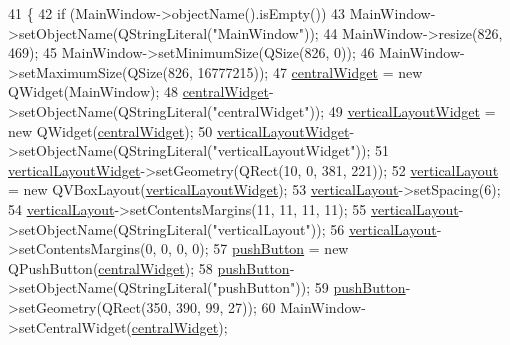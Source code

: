 \begin{DoxyCode}
41     \{
42         \textcolor{keywordflow}{if} (MainWindow->objectName().isEmpty())
43             MainWindow->setObjectName(QStringLiteral(\textcolor{stringliteral}{"MainWindow"}));
44         MainWindow->resize(826, 469);
45         MainWindow->setMinimumSize(QSize(826, 0));
46         MainWindow->setMaximumSize(QSize(826, 16777215));
47         \hyperlink{class_ui___main_window_a30075506c2116c3ed4ff25e07ae75f81}{centralWidget} = \textcolor{keyword}{new} QWidget(MainWindow);
48         \hyperlink{class_ui___main_window_a30075506c2116c3ed4ff25e07ae75f81}{centralWidget}->setObjectName(QStringLiteral(\textcolor{stringliteral}{"centralWidget"}));
49         \hyperlink{class_ui___main_window_a805d415fff07a22a85219e1f22f2da28}{verticalLayoutWidget} = \textcolor{keyword}{new} QWidget(\hyperlink{class_ui___main_window_a30075506c2116c3ed4ff25e07ae75f81}{centralWidget});
50         \hyperlink{class_ui___main_window_a805d415fff07a22a85219e1f22f2da28}{verticalLayoutWidget}->setObjectName(QStringLiteral(\textcolor{stringliteral}{"verticalLayoutWidget"}));
51         \hyperlink{class_ui___main_window_a805d415fff07a22a85219e1f22f2da28}{verticalLayoutWidget}->setGeometry(QRect(10, 0, 381, 221));
52         \hyperlink{class_ui___main_window_aecd96a04789fcfec3f98d80390ad8184}{verticalLayout} = \textcolor{keyword}{new} QVBoxLayout(\hyperlink{class_ui___main_window_a805d415fff07a22a85219e1f22f2da28}{verticalLayoutWidget});
53         \hyperlink{class_ui___main_window_aecd96a04789fcfec3f98d80390ad8184}{verticalLayout}->setSpacing(6);
54         \hyperlink{class_ui___main_window_aecd96a04789fcfec3f98d80390ad8184}{verticalLayout}->setContentsMargins(11, 11, 11, 11);
55         \hyperlink{class_ui___main_window_aecd96a04789fcfec3f98d80390ad8184}{verticalLayout}->setObjectName(QStringLiteral(\textcolor{stringliteral}{"verticalLayout"}));
56         \hyperlink{class_ui___main_window_aecd96a04789fcfec3f98d80390ad8184}{verticalLayout}->setContentsMargins(0, 0, 0, 0);
57         \hyperlink{class_ui___main_window_ad332d93084584930878f1daf5f84cdbf}{pushButton} = \textcolor{keyword}{new} QPushButton(\hyperlink{class_ui___main_window_a30075506c2116c3ed4ff25e07ae75f81}{centralWidget});
58         \hyperlink{class_ui___main_window_ad332d93084584930878f1daf5f84cdbf}{pushButton}->setObjectName(QStringLiteral(\textcolor{stringliteral}{"pushButton"}));
59         \hyperlink{class_ui___main_window_ad332d93084584930878f1daf5f84cdbf}{pushButton}->setGeometry(QRect(350, 390, 99, 27));
60         MainWindow->setCentralWidget(\hyperlink{class_ui___main_window_a30075506c2116c3ed4ff25e07ae75f81}{centralWidget});

\end{DoxyCode}
